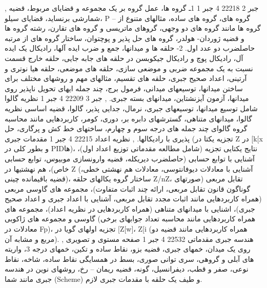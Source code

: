 \documentclass[class=article, crop=false]{standalone}
\begin{document}
{{{{        }}
        },{{
            جبر 2
        }{
            22218
        }{
            4
        }{
            جبر 1
        }{}{{
            1ـ گروه ها، عمل گروه بر یک مجموعه و قضایای مربوط، قضیه شمارشی برنساید، قضایای سیلو، P – گروه های، گروه های ساده، مثالهای متنوع از گروه ها مانند گروه های دو وجهی، گروهای ماتریسی و گروه های تقارن، رشته گروه ها و قضیه ژوردان- هولدر، گروه های حل پذیر و پوچتوان، ساختار گروه های از مرتبه حاصلضرب دو عدد اول. 2- حلقه ها و میدانها، جمع و ضرب ایده آلها، رادیکال یک ایده آل، رادیکال پوچ و رادیکال جیکوبسن در حلقه های جابه جایی، حلقه خارج قسمت نسبت به یک مجموعه ضربی و موضعی سازی، حلقه های موضعی، حلقه هیا نوتری و آرتینی، اعداد صحیح جبری، حلقه های تقسیم، مثالهای مهم و روشهای مختلف برای ساختن میدانها، توسیعهای میدانی، فرمول برج، چند جمله ایهای تحویل ناپذیر روی میدانها، آزمون آیزنشتاین، میدانهای بسته جبری.
        }}
        },{{
            جبر 3
        }{
            22209
        }{
            4
        }{
            جبر 1
        }{}{{
            نظریه گالوا شامل توسیع میدانها، توسیعهای جبری، نرمال، جدایی پذیر، گالوا، قضیه اساسی نظریه گالوا، میدانهای متناهی، گسترشهای دابره بر، دوری، کومر، کاربردهایی مانند محاسبه گروه گالوای چند جمله های درجه سوم و چهارم، ساختهای خط کش و پرگاری، حل پذیری با رادیکالها.
        }}
        },{{
            نظریه اعداد
        }{
            22215
        }{
            4
        }{
            جبر 1
        }{}{{
            مقدمات جبری (تجزیه یکتا در Z در [k[x و بطور کلی در PIDها)، نتایج یکتایی تجزیه (شامل مطالعه مقدماتی توزیع اعداد اول)، آشنایی با توابع حسابی (حاصلضرب دیریکله، قضیه وارونسازی موبیوس، توابع حسابی خاص)، هم نهشتیها در Z (آشنایی با معادلات دیوفانتوسی، معادلات هم نهشتی خطی، قضیه باقیمانده چینی)، ساختار گروه یکالهای حلقه Z/nZ، تقابل مربعی (صورتهای گوناگون قانون تقابل مربعی، ارائه چند اثبات متفاوت)، مجموعه های گاوسی مربعی (همراه کاربردهایی مانند اثبات مجدد تقابل مربعی، آشنایی با اعداد جبری و اعداد صحیح جبری)، اشنایی با میدانهای متناهی (همراه کاربردهایی در نظریه اعداد)، مجموعه های گاوسی و مجموعه های ژاکوبی (همراه کاربردهایی مانند محاسبه تعداد جوابهای برخی معادلات در Fp)، تجزیه اولهای گویا در [Z[w]، Z[i (همراه کاربردهایی مانند قضیه دو مربع و مشابه آن).
        }}
        },{{
            هندسه جبری مقدماتی
        }{
            22532
        }{
            4
        }{
            جبر 1
        }{}{{
            صفحه مستوی و تصویری روی یک میدان، خمهای جبری، قضیه بزو، نقاط ساده و تکین، خمهای درجه 3، واریته های آبلی و گروهی، سری توانی صوری، بسط در همسایگی نقاط ساده، شاخه، نقاط نوعی، صفر و قطب، دیفرانسیل، گونه، قضیه ریمان – رخ، روشهای نوین در هندسه جبری مانند شما (Scheme) و طیف یک حلقه با مقدمات جبری لازم.
}}}}
\end{document}
